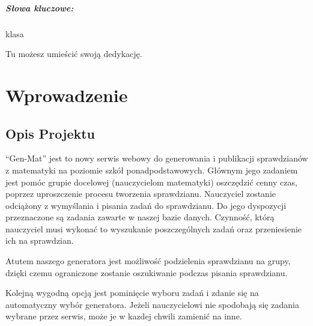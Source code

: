 \documentclass[oneside,polski,logo,indent]{amuthesis}
\author{Damian Kuich, Mikołaj Kowalczyk, Mateusz Michalski}
\date{Poznań, \today{} r.}
\begin{document}
\maketitle
\makestatement

\begin{streszczenie}
\lipsum[1]

\paragraph{Słowa kluczowe:} klasa
\end{streszczenie}

\begin{dedykacja}
Tu możesz umieścić swoją dedykację.
\end{dedykacja}

\tableofcontents


\chapter{Wprowadzenie}

\section{Opis Projektu}

“Gen-Mat” jest to nowy serwis webowy do generowania i publikacji sprawdzianów z matematyki na poziomie szkół ponadpodstawowych. Głównym jego zadaniem jest pomóc grupie docelowej (nauczycielom matematyki) oszczędzić cenny czas, poprzez uproszczenie procesu tworzenia sprawdzianu. Nauczyciel zostanie odciążony z wymyślania i pisania zadań do sprawdzianu. Do jego dyspozycji przeznaczone są zadania zawarte w naszej bazie danych. Czynność, którą nauczyciel musi wykonać to wyszukanie poszczególnych zadań oraz przeniesienie ich na sprawdzian.

Atutem naszego generatora jest możliwość podzielenia sprawdzianu na grupy, dzięki czemu ograniczone zostanie oszukiwanie podczas pisania sprawdzianu.

Kolejną wygodną opcją jest pominięcie wyboru zadań i zdanie się na automatyczny wybór generatora. Jeżeli nauczycielowi nie spodobają się zadania wybrane przez serwis, może je w kazdej chwili zamienić na inne.
\end{document}
